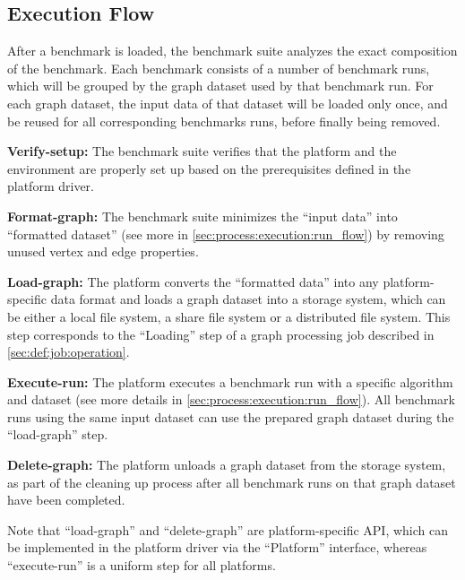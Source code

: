 \subsection{Execution Flow}
\label{sec:process:execution:exe_flow}
After a benchmark is loaded, the benchmark suite analyzes the exact composition of the benchmark. Each benchmark consists of a number of benchmark runs, which will be grouped by the graph dataset used by that benchmark run. For each graph dataset, the input data of that dataset will be loaded only once, and be reused for all corresponding benchmarks runs, before finally being removed.

\begin{enumerate}[label=\textbf{[\Alph*]}]
    \item \textbf{Verify-setup:} The benchmark suite verifies that the platform and the environment are properly set up based on the prerequisites defined in the platform driver.
    
    \item \textbf{Format-graph:} The benchmark suite minimizes the ``input data'' into ``formatted dataset'' (see more in \autoref{sec:process:execution:run_flow}) by removing unused vertex and edge properties.
    
    \item \textbf{Load-graph:} The platform converts the ``formatted data'' into any platform-specific data format and loads a graph dataset into a storage system, which can be either a local file system, a share file system or a distributed file system. This step corresponds to the ``Loading'' step of a graph processing job described in \autoref{sec:def:job:operation}.
    
    \item \textbf{Execute-run:} The platform executes a benchmark run with a specific algorithm and dataset (see more details in \autoref{sec:process:execution:run_flow}). All benchmark runs using the same input dataset can use the prepared graph dataset during the ``load-graph'' step. 
    
    \item \textbf{Delete-graph:} The platform unloads a graph dataset from the storage system, as part of the cleaning up process after all benchmark runs on that graph dataset have been completed.
\end{enumerate}

Note that ``load-graph'' and ``delete-graph'' are platform-specific API, which can be implemented in the platform driver via the ``Platform'' interface, whereas  ``execute-run'' is a uniform step for all platforms. 

